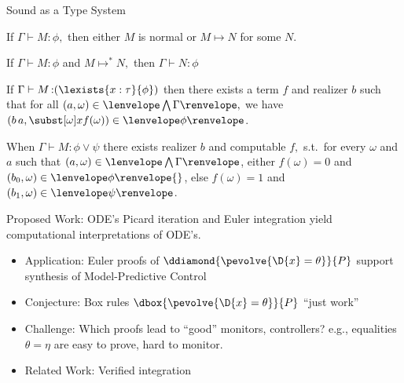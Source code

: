 \documentclass[slidestop,aspectratio=169]{beamer}
\newcommand{\fint}[2]{#2\lenvelope#1\renvelope}
\newcommand{\om}{\omega}
\newcommand{\stepsto}{\allowbreak\mapsto\allowbreak}
\newcommand{\stt}{\top}
\newcommand{\ssub}[3]{\subst[{#1}]{#2}{#3}}
\newcommand{\rzFst}[1]{#1_0}
\newcommand{\rzSnd}[1]{#1_1}
\newcommand{\rzApp}[2]{#1\,#2}
\renewcommand{\aa}{a}
\newcommand{\ab}{b}
\newcommand{\fintR}[1]{\fint{#1}{}} %
\newcommand*{\strategyforR}[2][]{{#2}\Langle{#1}\Rangle}
\newcommand{\cintR}[1]{\fintR{\bigwedge #1}}
\newcommand{\proves}[3]{#1\allowbreak\vdash #2 \allowbreak \mathop{:} #3}
\newcommand{\G}{\Gamma}
\theoremstyle{plain}
\theoremstyle{definition}
\theoremstyle{remark}
\begin{document}
\begin{frame}[t]{Sound as a Type System}
\begin{lemma}[Progress]
If $\proves{\Gamma}{M}{\phi},$ then either $M$ is normal or $M \stepsto N$ for some $N$.
\end{lemma}
\begin{lemma}[Preservation]
If $\proves{\Gamma}{M}{\phi}$ and $M \stepsto^* N,$ then $\proves{\Gamma}{N}{\phi}$
\end{lemma}
\begin{lemma}
If $\proves{\Gamma}{M}{(\lexists{x:\tau}{\phi})}$ then there exists a term $f$ and realizer $\ab$ such that for all $(\aa,\om) \in \cintR{\G},$
we have $(\rzApp{\ab}{\aa},\ssub{\om}{x}{f(\om)}) \in \fintR{\phi}$.
\label{lem:term-ep}
\end{lemma}
\begin{lemma}
When $\proves{\Gamma}{M}{\phi \lor \psi}$ there exists realizer $\ab$ and computable $f,$ s.t.\ for every $\om$ and $\aa$ such that $(\aa,\omega) \in \cintR{\G}$, either $f(\omega)=0$ and $(\rzFst{\ab},\omega) \in \fintR{\phi}{}$, else $f(\omega)=1$ and $(\rzSnd{\ab},\omega) \in \fintR{\psi}$.
\end{lemma}
\end{frame}

\begin{frame}[t]{Proposed Work: ODE's}
Picard iteration and Euler integration yield computational interpretations of ODE's.
\begin{itemize}
  \item Application: Euler proofs of $\ddiamond{\pevolve{\D{x}=\theta}}{P}$ support synthesis of Model-Predictive Control
  \item Conjecture: Box rules $\dbox{\pevolve{\D{x}=\theta}}{P}$ ``just work''
  \item Challenge: Which proofs lead to ``good'' monitors, controllers?
     e.g., equalities $\theta = \eta$ are easy to prove, hard to monitor.
  \item Related Work: Verified integration~\cite{DBLP:conf/itp/ImmlerT16}
\end{itemize}
\end{frame}
\end{document}
